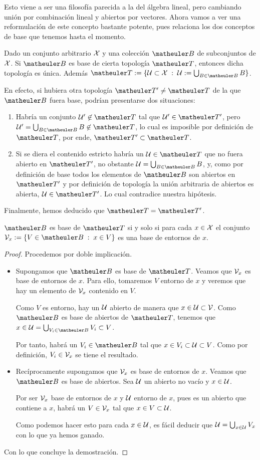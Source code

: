 Esto viene a ser una filosofía parecida a la del álgebra lineal, pero cambiando unión por combinación lineal y abiertos por vectores. Ahora vamos a ver una reformulación de este concepto bastante potente, pues relaciona los dos conceptos de base que tenemos hasta el momento.
\begin{obs}
	Dado un conjunto arbitrario $\mathcal{X}$ y una colección $\B$ de subconjuntos de $\mathcal{X}$. Si $\B$ es base de cierta topología $\T$, entonces dicha topología es única. Además $\T:=\{\U\subset\X\midc\U:=\bigcup_{B\in\B}B\}$.
	
	En efecto, si hubiera otra topología $\T'\not=\T$ de la que $\B$ fuera base, podrían presentarse dos situaciones:
	\begin{enumerate}
		\item Habría un conjunto $\U'\not\in\T$ tal que $\U'\in\T'$, pero $\U'=\bigcup_{B\in\B}B\not\in\T$, lo cual es imposible por definición de $\T$, por ende, $\T'\subset \T$.
		\item Si se diera el contenido estricto habría un $\U\in\T$ que no fuera abierto en $\T'$, no obstante $\U=\bigcup_{B\in\B}B$, y, como por definición de base todos los elementos de $\B$ son abiertos en $\T'$ y por definición de topología la unión arbitraria de abiertos es abierta, $\U\in\T'$. Lo cual contradice nuestra hipótesis.
	\end{enumerate}
	Finalmente, hemos deducido que $\T=\T'$.
\end{obs}
\begin{prop}
	\label{etop_prop_caracterizacionBases}
	$\B$ es base de $\T$ si y solo si para cada $x \in \mathcal{X}$ el conjunto
	$\V_x := \{ V \in \B \midc  x \in V\}$ es una base de entornos de $x$.
\end{prop}
\begin{proof}
	Procedemos por doble implicación.
	\begin{itemize}
		\item[\bra] Supongamos que $\B$ es base de $\T$. Veamos que $\mathcal{V}_x$ es base de entornos de $x$. Para ello, tomaremos $V$ entorno de $x$ y veremos que hay un elemento de $\mathcal{V}_x$ contenido en $V$.
		
		Como $V$ es entorno, hay un $\mathcal{U}$ abierto de manera que $x \in \mathcal{U} \subset \mathcal{V}$. Como $\B$ es base de abiertos de $\T$, tenemos que $x \in \U = \bigcup_{V_i \in \B} V_i \subset V$.
		
		Por tanto, habrá un $V_i \in \B$ tal que $x \in V_i \subset \mathcal{U} \subset V$. Como por definición, $V_i\in\mathcal{V}_x$ se tiene el resultado.
		\item[\bla] Recíprocamente supongamos que $\mathcal{V}_x$ es base de entornos de $x$. Veamos que $\B$ es base de abiertos. Sea $\mathcal{U}$ un abierto no vacío y $x \in \mathcal{U}$. 
		
		Por ser $\mathcal{V}_x$ base de entornos de $x$ y $\mathcal{U}$ entorno de $x$, pues es un abierto que contiene a $x$, habrá un $V \in \mathcal{V}_x$ tal que $x \in V \subset \mathcal{U}$.
		
		Como podemos hacer esto para cada $x \in \mathcal{U}$, es fácil deducir que $\mathcal{U} = \bigcup_{x \in \mathcal{U}} V_x$ con lo que ya hemos ganado.
	\end{itemize}
	Con lo que concluye la demostración.
\end{proof}

